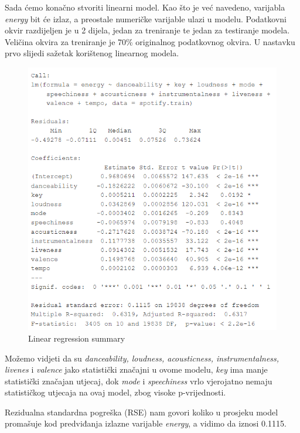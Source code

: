 	Sada ćemo konačno stvoriti linearni model. Kao što je već navedeno, varijabla \textit{energy} bit će izlaz, a preostale numeričke varijable ulazi u modelu.
	Podatkovni okvir razdijeljen je u 2 dijela, jedan za treniranje te jedan za testiranje modela. Veličina okvira za treniranje je 70\% originalnog podatkovnog okvira. 
	U nastavku prvo slijedi sažetak korištenog linearnog modela.
	
	\begin{figure}[H]
		\includegraphics[scale=0.9]{slike/linReg.png}
		\centering
		\caption{Linear regression summary}
		
	\end{figure}
	
	Možemo vidjeti da su \textit{danceability, loudness, acousticness, instrumentalness, livenes} i \textit{valence} jako statistički značajni u ovome modelu, \textit{key} ima manje statistički značajan utjecaj, dok \textit{mode} i \textit{speechiness} vrlo vjerojatno nemaju statističkog utjecaja na ovaj model, zbog visoke p-vrijednosti.
	
	Rezidualna standardna pogreška (RSE) nam govori koliko u prosjeku model promašuje kod predviđanja izlazne varijable \textit{energy}, a vidimo da iznosi 0.1115.
	
